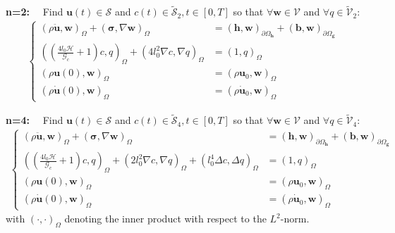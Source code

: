 \textbf{n=2:}$\quad$ Find $\mathbf{u}\left(t\right)\in\bm{\mathcal{S}}$ and $c\left(t\right)\in\tilde{\mathcal{S}}_{2},t\in\left[0,T\right]$ so that $\forall \mathbf{w}\in\bm{\mathcal{V}}$ and $\forall q\in\tilde{\mathcal{V}}_{2}$:
\begin{equation} \label{eq:weak_2}
\begin{aligned}
\left\{\begin{alignedat}{2}
	\left(\rho \ddot{\mathbf{u}},\mathbf{w}\right)_{\Omega} + \left(\bm{\sigma},\nabla\mathbf{w}\right)_{\Omega} &= \left(\mathbf{h},\mathbf{w}\right)_{\partial\Omega_{\mathbf{h}}} + \left(\mathbf{b},\mathbf{w}\right)_{\partial\Omega_{\mathbf{g}}} \\
	\left(\left(\frac{4l_{0}\mathcal{H}}{\mathcal{G}_{c}}+1\right)c,q\right)_{\Omega} + \left(4l_{0}^{2}\nabla c,\nabla q\right)_{\Omega} &= \left(1,q\right)_{\Omega} \\
	\left(\rho\mathbf{u}\left(0\right),\mathbf{w}\right)_{\Omega} &= \left(\rho\mathbf{u}_{0},\mathbf{w}\right)_{\Omega} \\
	\left(\rho\dot{\mathbf{u}}\left(0\right),\mathbf{w}\right)_{\Omega} &= \left(\rho\dot{\mathbf{u}}_{0},\mathbf{w}\right)_{\Omega}
\end{alignedat}\right.
\end{aligned}
\end{equation}

\textbf{n=4:}$\quad$ Find $\mathbf{u}\left(t\right)\in\bm{\mathcal{S}}$ and $c\left(t\right)\in\tilde{\mathcal{S}}_{4},t\in\left[0,T\right]$ so that $\forall \mathbf{w}\in\bm{\mathcal{V}}$ and $\forall q\in\tilde{\mathcal{V}}_{4}$:
\begin{equation} \label{eq:weak_4}
\begin{aligned}
\left\{\begin{alignedat}{2}
	\left(\rho \ddot{\mathbf{u}},\mathbf{w}\right)_{\Omega} + \left(\bm{\sigma},\nabla\mathbf{w}\right)_{\Omega} &= \left(\mathbf{h},\mathbf{w}\right)_{\partial\Omega_{\mathbf{h}}} + \left(\mathbf{b},\mathbf{w}\right)_{\partial\Omega_{\mathbf{g}}} \\
	\left(\left(\frac{4l_{0}\mathcal{H}}{\mathcal{G}_{c}}+1\right)c,q\right)_{\Omega} + \left(2l_{0}^{2}\nabla c,\nabla q\right)_{\Omega} + \left(l_{0}^{4}\Delta c,\Delta q\right)_{\Omega}&= \left(1,q\right)_{\Omega} \\
	\left(\rho\mathbf{u}\left(0\right),\mathbf{w}\right)_{\Omega} &= \left(\rho\mathbf{u}_{0},\mathbf{w}\right)_{\Omega} \\
	\left(\rho\dot{\mathbf{u}}\left(0\right),\mathbf{w}\right)_{\Omega} &= \left(\rho\dot{\mathbf{u}}_{0},\mathbf{w}\right)_{\Omega}
\end{alignedat}\right.
\end{aligned}
\end{equation}
with $\left(\cdot,\cdot\right)_{\Omega}$ denoting the inner product with respect to the $L^{2}$-norm.


